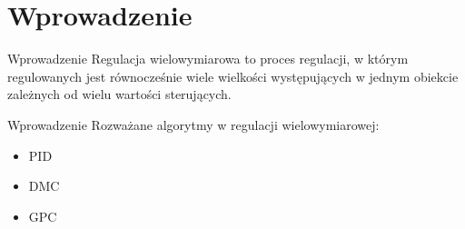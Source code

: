 \section{Wprowadzenie}
\begin{frame}{Wprowadzenie}
Regulacja wielowymiarowa to proces regulacji, w którym regulowanych jest równocześnie wiele wielkości występujących w jednym obiekcie zależnych od wielu wartości sterujących.
\end{frame}

\begin{frame}{Wprowadzenie}
Rozważane algorytmy w regulacji wielowymiarowej:
\begin{itemize}
    \item PID
    \item DMC
    \item GPC
\end{itemize}
\end{frame}